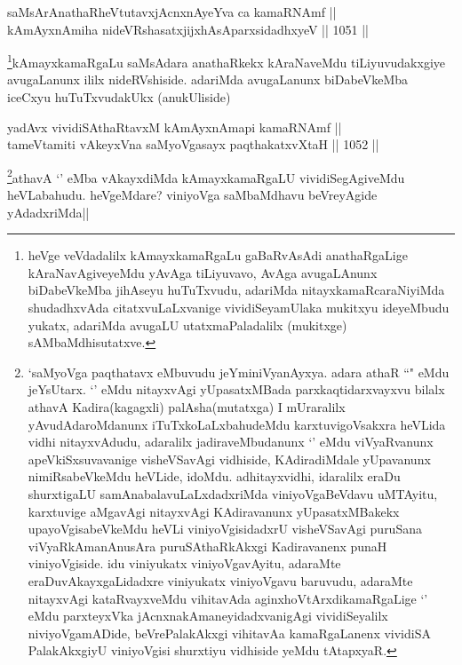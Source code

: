 \begin{shl}
saMsArAnathaRheVtutavxjAcnxnAyeYva ca kamaRNAmf || \\
kAmAyxnAmiha nideVRshasatxjijxhAsAparxsidadhxyeV ||  1051 ||  
\end{shl}

\begin{artha}
\footnote{heVge veVdadalilx kAmayxkamaRgaLu gaBaRvAsAdi anathaRgaLige kAraNavAgiveyeMdu yAvAga tiLiyuvavo, AvAga avugaLAnunx biDabeVkeMba jihAseyu huTuTxvudu, adariMda nitayxkamaRcaraNiyiMda shudadhxvAda citatxvuLaLxvanige vividiSeyamUlaka mukitxyu ideyeMbudu yukatx, adariMda avugaLU utatxmaPaladalilx (mukitxge) sAMbaMdhisutatxve.}kAmayxkamaRgaLu saMsAdara anathaRkekx kAraNaveMdu tiLiyuvudakxgiye avugaLanunx ililx nideRVshiside. adariMda avugaLanunx biDabeVkeMba iceCxyu huTuTxvudakUkx (anukUliside)
\end{artha}


\begin{shl}
yadAvx vividiSAthaRtavxM kAmAyxnAmapi kamaRNAmf || \\
tameVtamiti vAkeyxVna saMyoVgasayx paqthakatxvXtaH ||  1052 ||  
\end{shl}

\begin{artha}
\footnote{`saMyoVga paqthatavx eMbuvudu jeYminiVyanAyxya. adara athaR ``\stext" eMdu jeYsUtarx. `\stext' eMdu nitayxvAgi yUpasatxMBada parxkaqtidarxvayxvu bilalx athavA Kadira(kagagxli) palAsha(mutatxga) I mUraralilx yAvudAdaroMdanunx iTuTxkoLaLxbahudeMdu karxtuvigoVsakxra heVLida vidhi nitayxvAdudu, adaralilx jadiraveMbudanunx `\stext' eMdu viVyaRvanunx apeVkiSxsuvavanige visheVSavAgi vidhiside, KAdiradiMdale yUpavanunx nimiRsabeVkeMdu heVLide, idoMdu. adhitayxvidhi, idaralilx eraDu shurxtigaLU samAnabalavuLaLxdadxriMda viniyoVgaBeVdavu uMTAyitu, karxtuvige aMgavAgi nitayxvAgi KAdiravanunx yUpasatxMBakekx upayoVgisabeVkeMdu heVLi viniyoVgisidadxrU visheVSavAgi puruSana viVyaRkAmanAnusAra puruSAthaRkAkxgi Kadiravanenx punaH viniyoVgiside. idu viniyukatx viniyoVgavAyitu, adaraMte eraDuvAkayxgaLidadxre viniyukatx viniyoVgavu baruvudu, adaraMte nitayxvAgi kataRvayxveMdu vihitavAda aginxhoVtArxdikamaRgaLige `\stext' eMdu parxteyxVka jAcnxnakAmaneyidadxvanigAgi vividiSeyalilx niviyoVgamADide, beVrePalakAkxgi vihitavAa kamaRgaLanenx vividiSA PalakAkxgiyU viniyoVgisi shurxtiyu vidhiside yeMdu tAtapxyaR.}athavA `\stext' eMba vAkayxdiMda kAmayxkamaRgaLU vividiSegAgiveMdu heVLabahudu. heVgeMdare? viniyoVga saMbaMdhavu beVreyAgide yAdadxriMda||
\end{artha}

